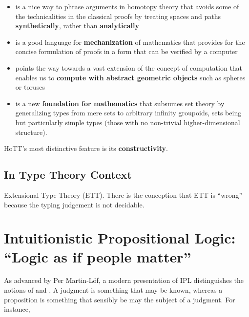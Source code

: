 \documentclass[12pt]{article}
\begin{document}
\begin{itemize}

\item is a nice way to phrase arguments in homotopy theory that avoids some of the technicalities
  in the classical proofs by treating spaces and paths \textbf{synthetically}, rather than
  \textbf{analytically}

\item is a good language for \textbf{mechanization} of mathematics that provides for the concise
  formulation of proofs in a form that can be verified by a computer

\item points the way towards a vast extension of the concept of computation that enables us to
  \textbf{compute with abstract geometric objects} such as spheres or toruses

\item is a new \textbf{foundation for mathematics} that subsumes set theory by generalizing
  types from mere sets to arbitrary infinity groupoids, sets being but particularly simple
  types (those with no non-trivial higher-dimensional structure).

\end{itemize}

HoTT's most distinctive feature is its \textbf{constructivity}.

\subsection{In Type Theory Context}\label{subsec:type_theory_context}

Extensional Type Theory (ETT).  There is the conception that ETT is ``wrong''~\cite{Harper2012}
because the typing judgement is not decidable.

\section{Intuitionistic Propositional Logic: ``Logic as if people matter''}\label{sec:ipl}


%
%
As advanced by Per Martin-L\"{o}f, a modern presentation of \gls{IPL} distinguishes the notions of  and .
A judgment is something that may be known, whereas a proposition is something that sensibly be may the subject of a judgment.
For instance, 
\end{document}
